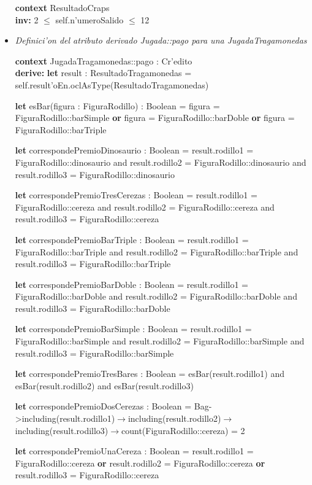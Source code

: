 \begin{itemize}
\textbf{context} ResultadoCraps \\ \textbf{inv:}
    2 $\leq$ self.n'umeroSalido $\leq$ 12



\item \textit{Definici'on del atributo derivado Jugada::pago para una JugadaTragamonedas}

\textbf{context} JugadaTragamonedas::pago : Cr'edito \\ \textbf{derive:}
    \textbf{let} result : ResultadoTragamonedas = self.result'oEn.oclAsType(ResultadoTragamonedas)

    \textbf{let} esBar(figura : FiguraRodillo) : Boolean = figura = FiguraRodillo::barSimple \textbf{or} figura = FiguraRodillo::barDoble \textbf{or} figura = FiguraRodillo::barTriple

    \textbf{let} correspondePremioDinosaurio : Boolean = result.rodillo1 = FiguraRodillo::dinosaurio and result.rodillo2 = FiguraRodillo::dinosaurio and result.rodillo3 = FiguraRodillo::dinosaurio
    
    \textbf{let} correspondePremioTresCerezas : Boolean = result.rodillo1 = FiguraRodillo::cereza and result.rodillo2 = FiguraRodillo::cereza and result.rodillo3 = FiguraRodillo::cereza
    
    \textbf{let} correspondePremioBarTriple : Boolean = result.rodillo1 = FiguraRodillo::barTriple and result.rodillo2 = FiguraRodillo::barTriple and result.rodillo3 = FiguraRodillo::barTriple
    
    \textbf{let} correspondePremioBarDoble : Boolean = result.rodillo1 = FiguraRodillo::barDoble and result.rodillo2 = FiguraRodillo::barDoble and result.rodillo3 = FiguraRodillo::barDoble
    
    \textbf{let} correspondePremioBarSimple : Boolean = result.rodillo1 = FiguraRodillo::barSimple and result.rodillo2 = FiguraRodillo::barSimple and result.rodillo3 = FiguraRodillo::barSimple
    
    \textbf{let} correspondePremioTresBares : Boolean = esBar(result.rodillo1) and esBar(result.rodillo2) and esBar(result.rodillo3)
    
    \textbf{let} correspondePremioDosCerezas : Boolean = Bag{}->including(result.rodillo1)$\rightarrow$including(result.rodillo2)$\rightarrow$including(result.rodillo3)$\rightarrow$count(FiguraRodillo::cereza) = 2
    
    \textbf{let} correspondePremioUnaCereza : Boolean = result.rodillo1 = FiguraRodillo::cereza \textbf{or} result.rodillo2 = FiguraRodillo::cereza \textbf{or} result.rodillo3 = FiguraRodillo::cereza
    

\end{itemize}
